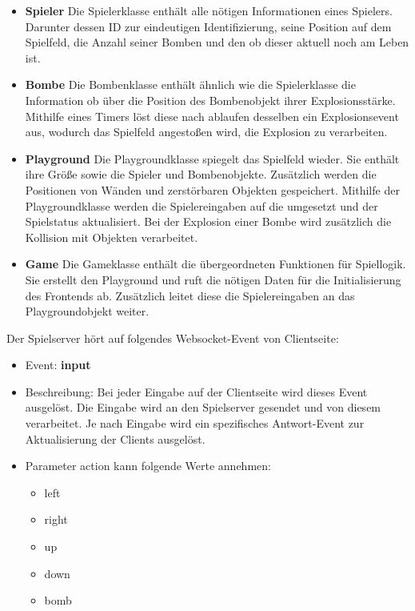 \documentclass[conference]{IEEEtran}
\begin{document}
\begin{itemize}
    \item \textbf{Spieler}
    Die Spielerklasse enthält alle nötigen Informationen eines 	Spielers. Darunter dessen ID zur eindeutigen 					Identifizierung, seine Position auf dem Spielfeld, die 			Anzahl seiner Bomben und den ob dieser aktuell noch am 			Leben ist.
    \smallskip
    \item \textbf{Bombe} 
    Die Bombenklasse enthält ähnlich wie die Spielerklasse die 	Information ob über die Position des Bombenobjekt ihrer 		Explosionsstärke. Mithilfe eines Timers löst diese nach 		ablaufen desselben ein Explosionsevent aus, wodurch das 		Spielfeld angestoßen wird, die Explosion zu verarbeiten.
    \smallskip
    \item \textbf{Playground}
    Die Playgroundklasse spiegelt das Spielfeld wieder. Sie 
    enthält ihre Größe sowie die Spieler und Bombenobjekte.
    Zusätzlich werden die Positionen von Wänden und 
    zerstörbaren Objekten gespeichert. Mithilfe der 
    Playgroundklasse werden die Spielereingaben auf die
   	umgesetzt und der Spielstatus aktualisiert. Bei der
   	Explosion einer Bombe wird zusätzlich die Kollision 
   	mit Objekten verarbeitet.
    \smallskip
    \item \textbf{Game}
    Die Gameklasse enthält die übergeordneten Funktionen für
    Spiellogik. Sie erstellt den Playground und ruft die 
    nötigen Daten für die Initialisierung des Frontends ab.
    Zusätzlich leitet diese die Spielereingaben an das
    Playgroundobjekt weiter.
    
\smallskip

\end{itemize}
Der Spielserver hört auf folgendes Websocket-Event von Clientseite:
\begin{itemize}
\item Event: \textbf{input}

\item Beschreibung:
    Bei jeder Eingabe auf der Clientseite wird dieses Event ausgelöst. Die Eingabe wird an den Spielserver gesendet und von diesem verarbeitet. Je nach Eingabe wird ein spezifisches Antwort-Event zur Aktualisierung der Clients ausgelöst.
    
\item Parameter \glqq action\grqq{} kann folgende Werte annehmen:
\begin{itemize}
    \item left
    \item right
    \item up
    \item down
    \item bomb
\end{itemize}
\end{itemize}
\end{document}
